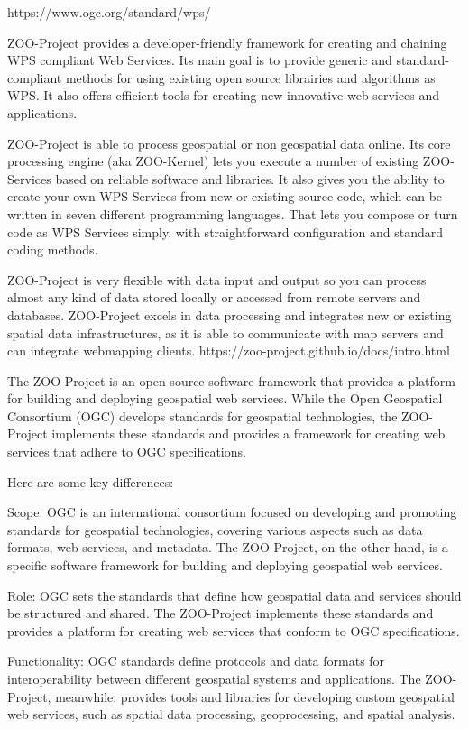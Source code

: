 \documentclass[class=scrbook, crop=false]{standalone}
\begin{document}
https://www.ogc.org/standard/wps/

ZOO-Project provides a developer-friendly framework for creating and chaining WPS compliant Web Services. Its main goal is to provide generic and standard-compliant methods for using existing open source librairies and algorithms as WPS. It also offers efficient tools for creating new innovative web services and applications.

ZOO-Project is able to process geospatial or non geospatial data online. Its core processing engine (aka ZOO-Kernel) lets you execute a number of existing ZOO-Services based on reliable software and libraries. It also gives you the ability to create your own WPS Services from new or existing source code, which can be written in seven different programming languages. That lets you compose or turn code as WPS Services simply, with straightforward configuration and standard coding methods.

ZOO-Project is very flexible with data input and output so you can process almost any kind of data stored locally or accessed from remote servers and databases. ZOO-Project excels in data processing and integrates new or existing spatial data infrastructures, as it is able to communicate with map servers and can integrate webmapping clients.
https://zoo-project.github.io/docs/intro.html



The ZOO-Project is an open-source software framework that provides a platform for building and deploying geospatial web services. While the Open Geospatial Consortium (OGC) develops standards for geospatial technologies, the ZOO-Project implements these standards and provides a framework for creating web services that adhere to OGC specifications.

Here are some key differences:

    Scope: OGC is an international consortium focused on developing and promoting standards for geospatial technologies, covering various aspects such as data formats, web services, and metadata. The ZOO-Project, on the other hand, is a specific software framework for building and deploying geospatial web services.

    Role: OGC sets the standards that define how geospatial data and services should be structured and shared. The ZOO-Project implements these standards and provides a platform for creating web services that conform to OGC specifications.

    Functionality: OGC standards define protocols and data formats for interoperability between different geospatial systems and applications. The ZOO-Project, meanwhile, provides tools and libraries for developing custom geospatial web services, such as spatial data processing, geoprocessing, and spatial analysis.
\end{document}
